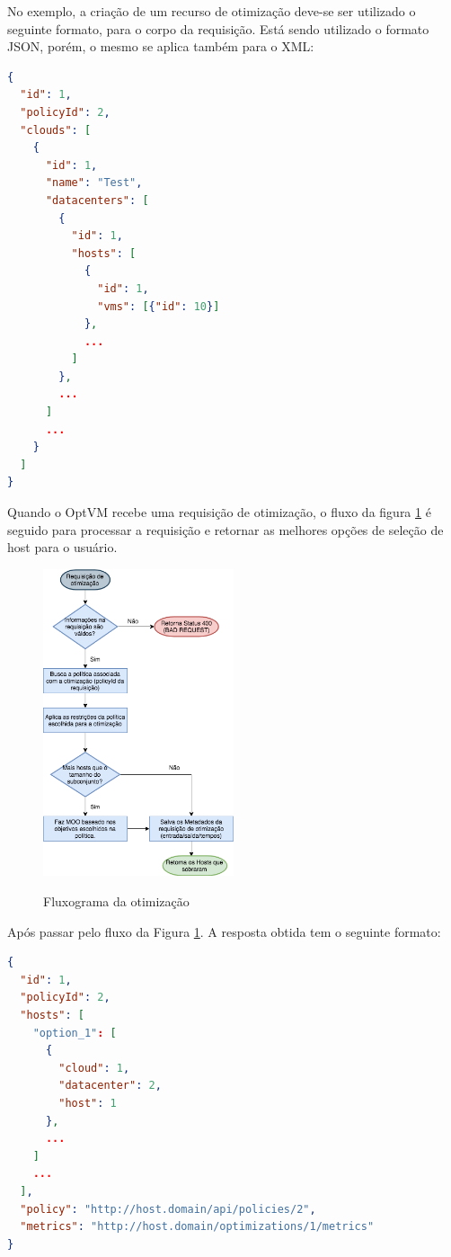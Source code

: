 No exemplo, a criação de um recurso de otimização deve-se ser utilizado o seguinte formato, 
para o corpo da requisição. Está sendo utilizado o formato JSON, porém, o mesmo se aplica 
também para o XML:



\begin{lstlisting}[language=json,firstnumber=1]
{
  "id": 1,
  "policyId": 2,
  "clouds": [
    {
      "id": 1,
      "name": "Test",
      "datacenters": [
        {
          "id": 1,
          "hosts": [
            {
              "id": 1,
              "vms": [{"id": 10}]
            },
            ...
          ]
        },
        ...
      ]
      ...
    }
  ]
}
\end{lstlisting}

Quando o OptVM recebe uma requisição de otimização, o fluxo da figura \ref{fig:fluxograma-otimizacao}
é seguido para processar a requisição e retornar as melhores opções de seleção de host
para o usuário.

\begin{figure}[!htb]
  \centering
  \caption{Fluxograma da otimização}
  \includegraphics[width=0.5\textwidth]{./dados/figuras/fluxograma-otimizacao.png}
  \label{fig:fluxograma-otimizacao}
\end{figure}

Após passar pelo fluxo da Figura \ref{fig:fluxograma-otimizacao}. A resposta 
obtida tem o seguinte formato:

\begin{lstlisting}[language=json,firstnumber=1]
{
  "id": 1,
  "policyId": 2,
  "hosts": [
    "option_1": [
      {
        "cloud": 1,
        "datacenter": 2,
        "host": 1
      },
      ...
    ] 
    ...
  ],
  "policy": "http://host.domain/api/policies/2",
  "metrics": "http://host.domain/optimizations/1/metrics"
}
\end{lstlisting}

